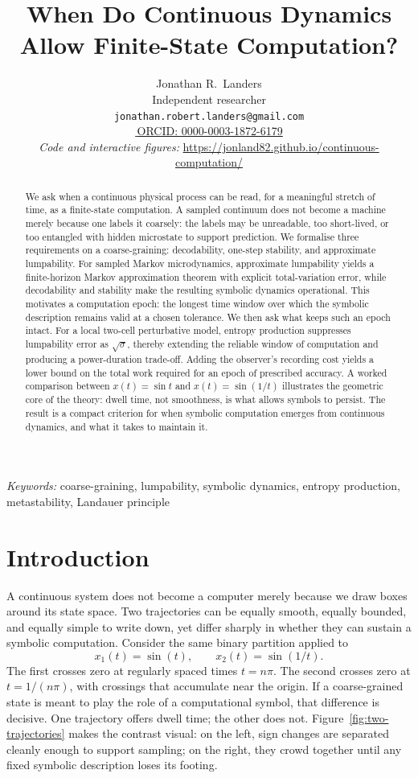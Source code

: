 \documentclass[11pt,a4paper]{article}
\title{\Large\textbf{When Do Continuous Dynamics Allow Finite-State Computation?}}
\author{Jonathan R.\ Landers\\[2pt]
\small Independent researcher\\[-1pt]
\small \texttt{jonathan.robert.landers@gmail.com}\\[2pt]
\small \href{https://orcid.org/0000-0003-1872-6179}{\textcolor{cOrcid}{\Large\textbullet}\,\textcolor{cBlue}{ORCID: 0000-0003-1872-6179}}\\[4pt]
\small \textit{Code and interactive figures:}
\small \url{https://jonland82.github.io/continuous-computation/}}
\date{}
\theoremstyle{definition}
\theoremstyle{remark}
\begin{document}
\maketitle

\begin{abstract}
We ask when a continuous physical process can be read, for a meaningful stretch of time, as a finite-state computation. A sampled continuum does not become a machine merely because one labels it coarsely: the labels may be unreadable, too short-lived, or too entangled with hidden microstate to support prediction. We formalise three requirements on a coarse-graining: decodability, one-step stability, and approximate lumpability. For sampled Markov microdynamics, approximate lumpability yields a finite-horizon Markov approximation theorem with explicit total-variation error, while decodability and stability make the resulting symbolic dynamics operational. This motivates a computation epoch: the longest time window over which the symbolic description remains valid at a chosen tolerance. We then ask what keeps such an epoch intact. For a local two-cell perturbative model, entropy production suppresses lumpability error as $\sqrt{\sigma}$, thereby extending the reliable window of computation and producing a power-duration trade-off. Adding the observer's recording cost yields a lower bound on the total work required for an epoch of prescribed accuracy. A worked comparison between $x(t)=\sin t$ and $x(t)=\sin(1/t)$ illustrates the geometric core of the theory: dwell time, not smoothness, is what allows symbols to persist. The result is a compact criterion for when symbolic computation emerges from continuous dynamics, and what it takes to maintain it.
\end{abstract}

\smallskip
\noindent\textit{Keywords:} coarse-graining, lumpability, symbolic dynamics, entropy production, metastability, Landauer principle

\section{Introduction}\label{sec:intro}

A continuous system does not become a computer merely because we draw boxes around its state space. Two trajectories can be equally smooth, equally bounded, and equally simple to write down, yet differ sharply in whether they can sustain a symbolic computation. Consider the same binary partition applied to
\begin{equation}\label{eq:two-trajectories}
x_1(t) = \sin(t), \qquad x_2(t) = \sin(1/t).
\end{equation}
The first crosses zero at regularly spaced times $t=n\pi$. The second crosses zero at $t=1/(n\pi)$, with crossings that accumulate near the origin. If a coarse-grained state is meant to play the role of a computational symbol, that difference is decisive. One trajectory offers dwell time; the other does not. Figure~\ref{fig:two-trajectories} makes the contrast visual: on the left, sign changes are separated cleanly enough to support sampling; on the right, they crowd together until any fixed symbolic description loses its footing.
\end{document}
